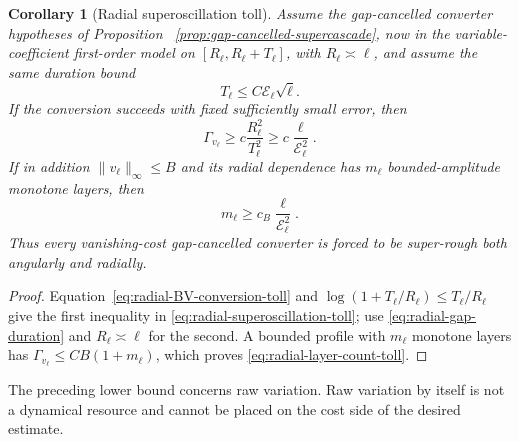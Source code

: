 \documentclass[11pt]{article}
\newtheorem{corollary}[theorem]{Corollary}
\theoremstyle{definition}
\theoremstyle{remark}
\begin{document}
\begin{corollary}[Radial superoscillation toll]
\label{cor:radial-superoscillation-toll}
Assume the gap-cancelled converter hypotheses of Proposition
~\ref{prop:gap-cancelled-supercascade}, now in the variable-coefficient
first-order model on $[R_\ell,R_\ell+T_\ell]$, with
$R_\ell\asymp\ell$, and assume the same duration bound
\begin{equation}
 T_\ell\leq C\mathcal E_\ell\sqrt\ell.
 \label{eq:radial-gap-duration}
\end{equation}
If the conversion succeeds with fixed sufficiently small error, then
\begin{equation}
 \Gamma_{v_\ell}
 \geq c\frac{R_\ell^2}{T_\ell^2}
 \geq c\frac{\ell}{\mathcal E_\ell^2}.
 \label{eq:radial-superoscillation-toll}
\end{equation}
If in addition $\|v_\ell\|_\infty\leq B$ and its radial dependence has
$m_\ell$ bounded-amplitude monotone layers, then
\begin{equation}
 m_\ell\geq c_B\frac{\ell}{\mathcal E_\ell^2}.
 \label{eq:radial-layer-count-toll}
\end{equation}
Thus every vanishing-cost gap-cancelled converter is forced to be super-rough
both angularly and radially.
\end{corollary}

\begin{proof}
Equation~\eqref{eq:radial-BV-conversion-toll} and
$\log(1+T_\ell/R_\ell)\leq T_\ell/R_\ell$ give the first inequality in
\eqref{eq:radial-superoscillation-toll}; use
\eqref{eq:radial-gap-duration} and $R_\ell\asymp\ell$ for the second.
A bounded profile with $m_\ell$ monotone layers has
$\Gamma_{v_\ell}\leq C B(1+m_\ell)$, which proves
\eqref{eq:radial-layer-count-toll}.
\end{proof}

The preceding lower bound concerns raw variation.  Raw variation by itself is
not a dynamical resource and cannot be placed on the cost side of the desired
estimate.
\end{document}
